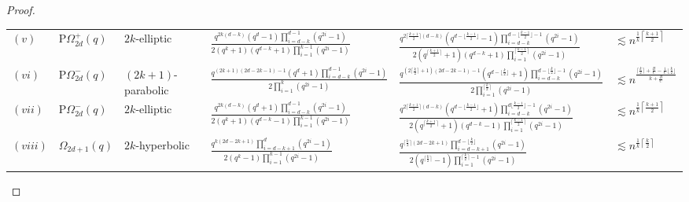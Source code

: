 \documentclass[a4paper]{amsart}
\theoremstyle{definition}
\begin{document}
\begin{proof}
{\begin{table}
\begin{tabularx}{\textwidth}{l l l X X l}
        $(v)$ & $\mathrm{P}\Omega_{2d}^+(q)$ & $2k$-elliptic & $\displaystyle \frac{q^{2k(d-k)}(q^d - 1)\prod \limits_{i=d-k}^{d-1}(q^{2i} - 1)}{2(q^k + 1)(q^{d-k}+1)\prod \limits_{i = 1}^{k-1}(q^{2i} - 1)}$ &
        $\displaystyle \frac{q^{2\lceil \frac{k+1}{2}\rceil(d-k)}(q^{d - \lfloor \frac{k-1}{2}\rfloor} - 1)\prod \limits_{i=d-k}^{d- \lfloor \frac{k-1}{2}\rfloor -1}(q^{2i} - 1)}{2(q^{\lceil \frac{k+1}{2} \rceil} + 1)(q^{d-k}+1)\prod \limits_{i = 1}^{\lceil \frac{k-1}{2} \rceil}(q^{2i} - 1)}$ & $\displaystyle \lesssim n^{\frac{1}{k} \left\lceil \frac{k+1}{2} \right\rceil}$ \\
        
        $(vi)$ & $\mathrm{P}\Omega_{2d}^-(q)$ &  $(2k+1)$-parabolic & $\displaystyle \frac{q^{(2k+1)(2d -2k -1) -1}(q^d + 1)\prod \limits_{i=d-k}^{d-1}(q^{2i} - 1)}{2\prod \limits_{i = 1}^{k}(q^{2i} - 1)}$ &
        $\displaystyle \frac{q^{(2\lceil \frac{k}{2}\rceil+1)(2d -2k -1) -1}(q^{d - \lfloor\frac{k}{2} \rfloor} + 1)\prod \limits_{i=d-k}^{d- \lfloor\frac{k}{2} \rfloor-1}(q^{2i} - 1)}{2\prod \limits_{i = 1}^{\lceil \frac{k}{2} \rceil}(q^{2i} - 1)}$ & $\displaystyle \lesssim n^{\frac{\lceil \frac{k}{2}\rceil + \frac{B}{C} - \frac{1}{C}\lfloor \frac{k}{2}\rfloor}{k + \frac{B}{C}}}$\\
        
        $(vii)$ & $\mathrm{P}\Omega_{2d}^-(q)$ &  $2k$-elliptic & $\displaystyle \frac{q^{2k(d -k)}(q^d + 1)\prod \limits_{i=d-k}^{d-1}(q^{2i} - 1)}{2(q^k + 1)(q^{d-k}-1)\prod \limits_{i = 1}^{k-1}(q^{2i} - 1)}$ & $\displaystyle \frac{q^{2\lceil\frac{k+1}{2}\rceil (d -k)}(q^{d-\lfloor \frac{k-1}{2} \rfloor} + 1)\prod \limits_{i=d-k}^{d \lfloor \frac{k-1}{2} \rfloor -1}(q^{2i} - 1)}{2(q^{\lceil \frac{k+1}{2} \rceil} + 1)(q^{d-k}-1)\prod \limits_{i = 1}^{\lceil \frac{k-1}{2} \rceil}(q^{2i} - 1)}$ & $\displaystyle \lesssim n^{\frac{1}{k} \left\lceil \frac{k+1}{2} \right\rceil}$ \\
        
        $(viii)$ & $\Omega_{2d+1}(q)$ &   $2k$-hyperbolic & $\displaystyle \frac{q^{k(2d-2k+1)}\prod \limits_{i=d-k+1}^{d}(q^{2i} - 1)}{2 (q^k - 1)\prod \limits_{i = 1}^{k-1}(q^{2i} - 1)}$ & $\displaystyle \frac{q^{\lceil \frac{k}{2}\rceil (2d-2k+1)}\prod \limits_{i=d-k+1}^{d - \lfloor \frac{k}{2}\rfloor}(q^{2i} - 1)}{2 (q^{\lceil \frac{k}{2}\rceil} - 1)\prod \limits_{i = 1}^{\lceil \frac{k}{2} \rceil -1}(q^{2i} - 1)}$ & $\displaystyle \lesssim n^{\frac{1}{k} \left\lceil \frac{k}{2}\right\rceil}$\\
        

\end{tabularx}
\end{table}}
\end{proof}
\end{document}
